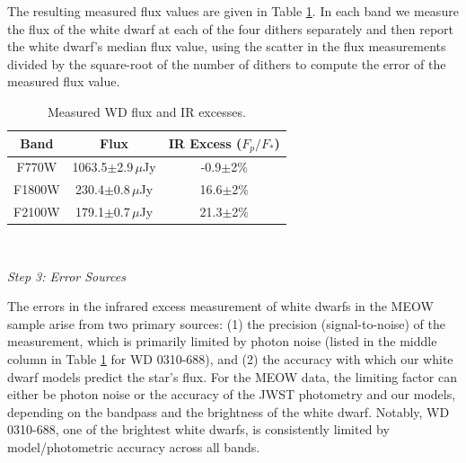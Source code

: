 \documentclass[twocolumn]{aastex631}
\begin{document}
The resulting measured flux values are given in Table \ref{WDflux}. In each band we measure the flux of the white dwarf at each of the four dithers separately and then report the white dwarf's median flux value, using the scatter in the flux measurements divided by the square-root of the number of dithers to compute the error of the measured flux value.  



\begin{table}[b]
\centering
\caption{Measured WD flux and IR excesses.}
\label{WDflux}
\begin{tabular}{c|c|c}
Band & Flux & IR Excess ($F_p/F_*$)\\ 
\hline 
F770W & 1063.5$\pm$2.9\,$\mu$Jy & -0.9$\pm$2\%\\ %
F1800W & 230.4$\pm$0.8\,$\mu$Jy  & 16.6$\pm$2\% \\ %
F2100W & 179.1$\pm$0.7\,$\mu$Jy  & 21.3$\pm$2\% %
\end{tabular}
\\
\vspace{1mm}
\end{table}


\begin{center}
    \vspace{-1mm}
    {\it Step 3: Error Sources}
    \vspace{-2mm}
\end{center}
The errors in the infrared excess measurement of white dwarfs in the MEOW sample arise from two primary sources: (1) the precision (signal-to-noise) of the measurement, which is primarily limited by photon noise (listed in the middle column in Table \ref{WDflux} for WD 0310-688), and (2) the accuracy with which our white dwarf models predict the star's flux. For the MEOW data, the limiting factor can either be photon noise or the accuracy of the JWST photometry and our models, depending on the bandpass and the brightness of the white dwarf. Notably, WD 0310-688, one of the brightest white dwarfs, is consistently limited by model/photometric accuracy across all bands.
\end{document}
